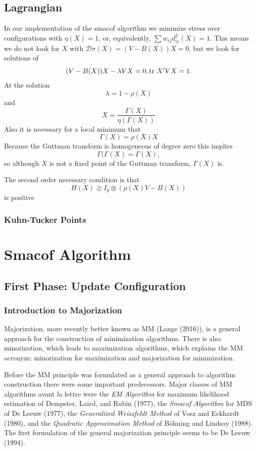 \documentclass[
  12pt,
]{article}
\begin{document}
\subsection{Lagrangian}\label{lagrangian}

In our implementation of the smacof algorithm we minimize stress over
configurations with \(\eta(X)=1\), or, equivalently,
\(\sum w_{ij}d_{ij}^2(X)=1\). This means we do not look for \(X\) with
\(\mathcal{D}\sigma(X)=(V-B(X))X=0\), but we look for solutions of \[
(V-B(X))X-\lambda VX=0,\\
\text{tr}\ X'VX= 1.
\] At the solution \[
\lambda=1-\rho(X)
\] and \[
X = \frac{\Gamma(X)}{\eta(\Gamma(X))}
\] Also it is necessary for a local minimum that \[
\Gamma(X)=\rho(X)X
\] Because the Guttman transform is homogeneous of degree zero this
implies \[
\Gamma(\Gamma(X)=\Gamma(X),
\] so although \(X\) is not a fixed point of the Guttman transform,
\(\Gamma(X)\) is.

The second order necessary condition is that \[
H(X)\gtrsim I_p\otimes (\rho(X)V - B(X))
\] is positive

\subsubsection{Kuhn-Tucker Points}\label{kuhn-tucker-points}

\section{Smacof Algorithm}\label{smacof-algorithm}

\subsection{First Phase: Update Configuration}\label{first-phase-update-configuration}

\subsubsection{Introduction to Majorization}\label{introduction-to-majorization}

Majorization, more recently better known as MM (Lange (2016)), is a general
approach for the construction of minimization algorithms. There is also
minorization, which leads to maximization algorithms, which explains the
MM acronym: minorization for maximization and majorization for
minimization.

Before the MM principle was formulated as a general approach to
algorithm construction there were some important predecessors. Major
classes of MM algorithms avant la lettre were the \emph{EM Algorithm} for
maximum likelihood estimation of Dempster, Laird, and Rubin (1977), the \emph{Smacof
Algorithm} for MDS of De Leeuw (1977), the \emph{Generalized Weiszfeldt Method}
of Vosz and Eckhardt (1980), and the \emph{Quadratic Approximation Method} of
Böhning and Lindsay (1988). The first formulation of the general majorization
principle seems to be De Leeuw (1994).
\end{document}
